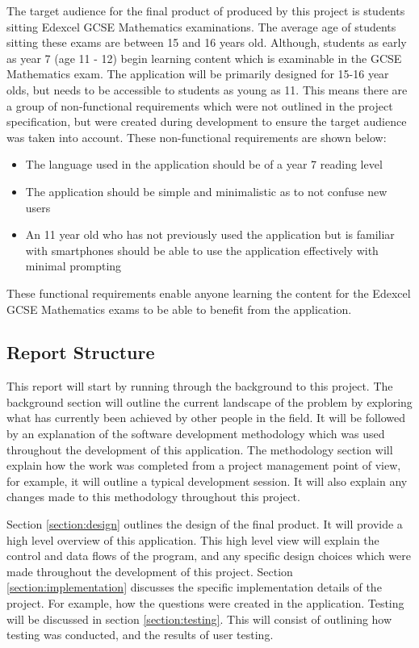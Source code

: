 \documentclass{article}
\begin{document}
The target audience for the final product of produced by this project is students sitting Edexcel GCSE Mathematics examinations. The average age of students sitting these exams are between 15 and 16 years old. Although, students as early as year 7 (age 11 - 12) begin learning content which is examinable in the GCSE Mathematics exam. The application will be primarily designed for 15-16 year olds, but needs to be accessible to students as young as 11. This means there are a group of non-functional requirements which were not outlined in the project specification, but were created during development to ensure the target audience was taken into account. These non-functional requirements are shown below:

\begin{itemize}
	\item The language used in the application should be of a year 7 reading level
	\item The application should be simple and minimalistic as to not confuse new users
	\item An 11 year old who has not previously used the application but is familiar with smartphones should be able to use the application effectively with minimal prompting
\end{itemize}

These functional requirements enable anyone learning the content for the Edexcel GCSE Mathematics exams to be able to benefit from the application.

\subsection{Report Structure}

This report will start by running through the background to this project. The background section will outline the current landscape of the problem by exploring what has currently been achieved by other people in the field. It will be followed by an explanation of the software development methodology which was used throughout the development of this application. The methodology section will explain how the work was completed from a project management point of view, for example, it will outline a typical development session. It will also explain any changes made to this methodology throughout this project. \par

Section \ref{section:design} outlines the design of the final product. It will provide a high level overview of this application. This high level view will explain the control and data flows of the program, and any specific design choices which were made throughout the development of this project. Section \ref{section:implementation} discusses the specific implementation details of the project. For example, how the questions were created in the application. Testing will be discussed in section \ref{section:testing}. This will consist of outlining how testing was conducted, and the results of user testing. \par
\end{document}

